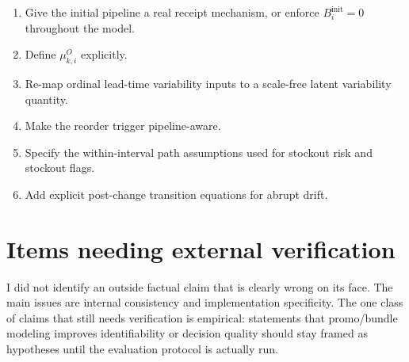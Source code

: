 \documentclass[11pt]{article}
\begin{document}
\begin{enumerate}
  \item Give the initial pipeline a real receipt mechanism, or enforce $B^{\mathrm{init}}_i=0$ throughout the model.
  \item Define $\mu^{O}_{k,i}$ explicitly.
  \item Re-map ordinal lead-time variability inputs to a scale-free latent variability quantity.
  \item Make the reorder trigger pipeline-aware.
  \item Specify the within-interval path assumptions used for stockout risk and stockout flags.
  \item Add explicit post-change transition equations for abrupt drift.
\end{enumerate}

\section*{Items needing external verification}

I did not identify an outside factual claim that is clearly wrong on its face.
The main issues are internal consistency and implementation specificity.
The one class of claims that still needs verification is empirical: statements that promo/bundle modeling improves identifiability or decision quality should stay framed as hypotheses until the evaluation protocol is actually run.
\end{document}

